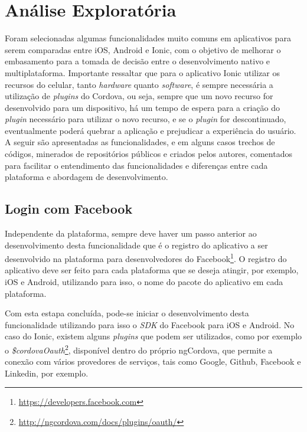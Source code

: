 \chapter{Análise Exploratória} \label{cap:analise_exploratoria}


Foram selecionadas algumas funcionalidades muito comuns em aplicativos para serem comparadas entre iOS, Android e Ionic, com o objetivo de melhorar o embasamento para a tomada de decisão entre o desenvolvimento 
nativo e multiplataforma. Importante ressaltar que para o aplicativo Ionic utilizar os recursos do celular, tanto \textit{hardware} quanto \textit{software}, é sempre necessária a utilização de 
\textit{plugins} do Cordova, ou seja, sempre que um novo recurso for desenvolvido para um dispositivo, há um tempo de espera para a criação do \textit{plugin} necessário para utilizar o novo recurso, 
e se o \textit{plugin} for descontinuado, eventualmente poderá quebrar a aplicação e prejudicar a experiência do usuário. A seguir são apresentadas as funcionalidades, e em alguns casos trechos de códigos, minerados 
de repositórios públicos e criados pelos autores, comentados para facilitar o entendimento das funcionalidades e diferenças entre cada plataforma e abordagem de desenvolvimento. 

\section{Login com Facebook} \label{subsubsec:loginfb}
Independente da plataforma, sempre deve haver um passo anterior ao desenvolvimento desta funcionalidade que é o registro do 
aplicativo a ser desenvolvido na plataforma para desenvolvedores do Facebook\footnote{\url{https://developers.facebook.com}}. O registro do aplicativo deve ser feito
para cada plataforma que se deseja atingir, por exemplo, iOS e Android, utilizando para isso, o nome do pacote do aplicativo em cada plataforma. 

Com esta estapa concluída, pode-se iniciar o desenvolvimento desta funcionalidade utilizando para isso o \textit{SDK} do Facebook para iOS e Android.
No caso do Ionic, existem alguns \textit{plugins} que podem ser utilizados, como por exemplo o \textit{\$cordovaOauth}\footnote{\url{http://ngcordova.com/docs/plugins/oauth/}}, disponível dentro do próprio ngCordova, 
que permite a conexão com vários provedores de serviços, tais como Google, Github, Facebook e Linkedin, por exemplo. 


